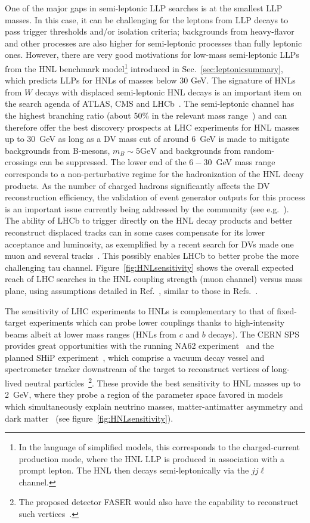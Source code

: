One of the major gaps in semi-leptonic LLP searches is at the smallest LLP masses. In this case, it can be challenging for the leptons from LLP decays to pass trigger thresholds and/or isolation criteria; backgrounds from heavy-flavor and other processes are also higher for semi-leptonic processes than fully leptonic ones. However, there are very good motivations for low-mass semi-leptonic LLPs from the HNL benchmark model\footnote{In the language of simplified models, this corresponds to the charged-current production mode, where the HNL LLP is produced in association with a prompt lepton. The HNL then decays semi-leptonically via the $jj\ell$ channel.} introduced in Sec.~\ref{sec:leptonicsummary}, which predicts LLPs for HNLs of masses below 30 GeV. The signature of HNLs from $W$ decays with displaced semi-leptonic HNL decays is an important item on the search agenda of ATLAS, CMS and LHCb~\cite{Helo2014,Izaguirre2015,Mermod2017,Antusch2017,Nemevsek:2018bbt,Cottin:2018kmq}. The semi-leptonic channel has the highest branching ratio (about 50\% in the relevant mass range~\cite{Gronau1984}) and can therefore offer the best discovery prospects at LHC experiments for HNL masses up to 30~GeV as long as a DV mass cut of around 6~GeV is made to mitigate backgrounds from B-mesons, $m_B \sim 5 \mbox{GeV}$ and backgrounds from random-crossings can be suppressed. The lower end of the $6-30$~GeV mass range corresponds to a non-perturbative regime for the hadronization of the HNL decay products. As the number of charged hadrons significantly affects the DV reconstruction efficiency, the validation of event generator outputs for this process is an important issue currently being addressed by the community (see e.g.~\cite{Cottin:2018kmq}). The ability of LHCb to trigger directly on the HNL decay products and better reconstruct displaced tracks can in some cases compensate for its lower acceptance and luminosity, as exemplified by a recent search for DVs made one muon and several tracks~\cite{LHCb2017,Antusch2017}. This possibly enables LHCb to better probe the more challenging tau channel. Figure~\ref{fig:HNLsensitivity} shows the overall expected reach of LHC searches in the HNL coupling strength (muon channel) versus mass plane, using assumptions detailed in Ref.~\cite{Mermod2017}, similar to those in Refs.~\cite{Helo2014,Izaguirre2015}. 

The sensitivity of LHC experiments to HNLs is complementary to that of fixed-target experiments which can probe lower couplings thanks to high-intensity beams albeit at lower mass ranges (HNLs from $c$ and $b$ decays). The CERN SPS provides great opportunities with the running NA62 experiment~\cite{NA622017a} and the planned SHiP experiment~\cite{SHiP2015}, which comprise a vacuum decay vessel and spectrometer tracker downstream of the target to reconstruct vertices of long-lived neutral particles~\footnote{The proposed detector FASER would also have the capability to reconstruct such vertices~\cite{Kling:2018wct}.}. These provide the best sensitivity to HNL masses up to 2~GeV, where they probe a region of the parameter space favored in models which simultaneously explain neutrino masses, matter-antimatter asymmetry and dark matter~\cite{Asaka2005b,Canetti2013b,Mermod2017b,Drewes:2017zyw} (see figure~\ref{fig:HNLsensitivity}).


